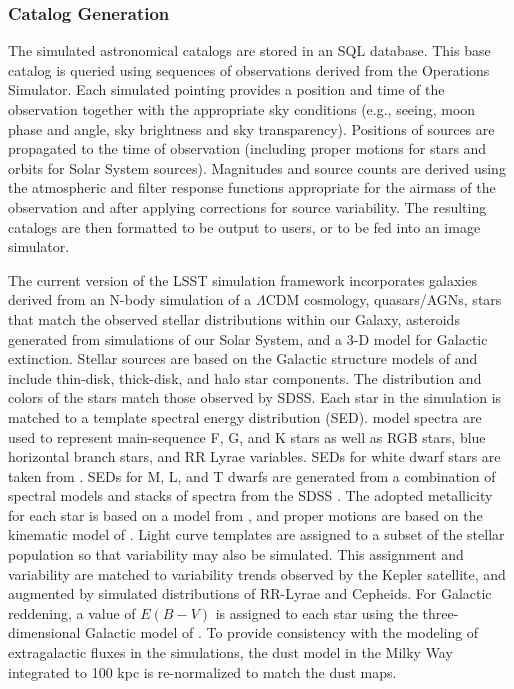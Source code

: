 \subsubsection{Catalog Generation}
\label{sec:catalogs}

The simulated astronomical catalogs \citep[CatSim;][]{2014SPIE.9150E..14C} are
stored in an SQL database. This base catalog is queried using
sequences of observations derived from the Operations Simulator. Each
simulated pointing provides a position and time of the observation
together with the appropriate sky conditions (e.g., seeing, moon phase
and angle, sky brightness and sky transparency). Positions of sources
are propagated to the time of observation (including proper motions
for stars and orbits for Solar System sources). Magnitudes and source
counts are derived using the atmospheric and filter response functions
appropriate for the airmass of the observation and after applying
corrections for source variability.  The resulting catalogs are then
formatted to be output to users, or to be fed into an image
simulator.

The current version of the LSST simulation framework incorporates
galaxies derived from an N-body simulation of a $\Lambda$CDM
cosmology, quasars/AGNs, stars that match the observed stellar
distributions within our Galaxy, asteroids generated from simulations
of our Solar System, and a 3-D model for Galactic extinction.  Stellar
sources are based on the Galactic structure models of \citet{2008ApJ...673..864J}
and include thin-disk, thick-disk, and halo star
components. The distribution and colors of the stars match those
observed by SDSS. Each star in the simulation is matched to a template
spectral energy distribution (SED). \citet{1993sssp.book.....K} model spectra are
used to represent main-sequence F, G, and K stars as well as RGB
stars, blue horizontal branch stars, and RR Lyrae variables.  SEDs for
white dwarf stars are taken from \citet{1995PASP..107.1047B}.  SEDs for M,
L, and T dwarfs are generated from a combination of spectral models
and stacks of spectra from the SDSS
\citep[e.g.,][]{2005ApJ...623.1115C,2007AJ....133..531B,2006ApJ...640.1063B,1989A&A...217..187P,2010ApJ...714L..98K}.
The adopted metallicity for each star is based
on a model from \citet{2008ApJ...684..287I}, and proper motions are
based on the kinematic model of \citet{2010ApJ...716....1B}.  Light curve
templates are assigned to a subset of the stellar population so that
variability may also be simulated. This assignment and variability are
matched to variability trends observed by the Kepler satellite, and
augmented by
simulated distributions of RR-Lyrae and Cepheids. For Galactic reddening, a
value of $E(B-V)$ is assigned to each star using the three-dimensional
Galactic model of \citet{2005AJ....130..659A}. To provide consistency with
the modeling of extragalactic fluxes in the simulations, the dust model in the Milky Way integrated
to 100 kpc is re-normalized to match the \citet{1998ApJ...500..525S} dust maps.

